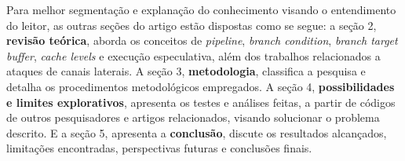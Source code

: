 \documentclass[
	article,			    %
	12pt,				    %
	oneside,			    %
	a4paper,			    %
	chapter=TITLE,		    %
	section=TITLE,		    %
	subsection=TITLE,	    %
	english,			    %
	brazil,				    %
	sumario=tradicional
]{abntex2}
\begin{document}
Para melhor segmentação e explanação do conhecimento visando o entendimento do leitor, as outras seções do artigo estão dispostas como se segue: a seção 2, \textbf{revisão teórica}, aborda os conceitos de \emph{pipeline}, \emph{branch condition}, \emph{branch target buffer}, \emph{cache levels} e execução especulativa, além dos trabalhos relacionados a ataques de canais laterais. A seção 3, \textbf{metodologia}, classifica a pesquisa e detalha os procedimentos metodológicos empregados. A seção 4, \textbf{possibilidades e limites explorativos}, apresenta os testes e análises feitas, a partir de códigos de outros pesquisadores e artigos relacionados, visando solucionar o problema descrito. E a seção 5, apresenta a \textbf{conclusão}, discute os resultados alcançados, limitações encontradas, perspectivas futuras e conclusões finais.

\begin{comment}
\subsection{Organização do Artigo}
O restante do artigo está organizado como se segue: a seção 2, \textbf{Revisão Teórica}, aborda os conceitos de \emph{Pipeline}, \emph{Branch Condition}, \emph{Branch Target Buffer}, \emph{Cache  Levels} e Execução Especulativa, além dos trabalhos relacionados a \textbf{Ataques de Canais Laterais}. A seção 3, Metodologia, classifica a pesquisa e detalha os procedimentos metodológicos empregados. A seção 4, Possibilidades e Limites Explorativos, apresenta os testes e análises feitas, a partir de códigos de outros pesquisadores e artigos relacionados, visando solucionar o problema descrito. A seção 5, apresenta a \textbf{Conclusão}, discute os resultados alcançados, limitações encontradas, perspectivas futuras e conclusões finais.
\end{comment}
\end{document}
